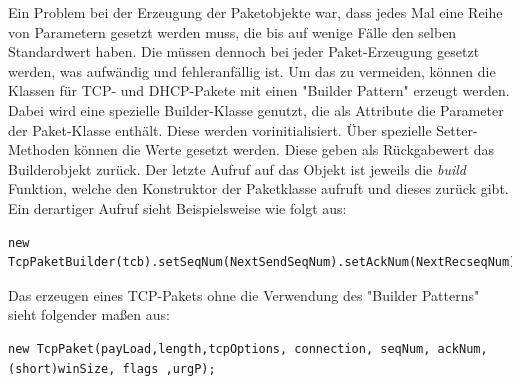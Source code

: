 Ein Problem bei der Erzeugung der Paketobjekte war, dass jedes Mal eine Reihe von Parametern gesetzt werden muss, die bis auf wenige Fälle den selben Standardwert haben. Die müssen dennoch bei jeder Paket-Erzeugung gesetzt werden, was aufwändig und fehleranfällig ist. Um das zu vermeiden, können die Klassen für TCP- und DHCP-Pakete mit einen "{}Builder Pattern"{} erzeugt werden.  Dabei wird eine spezielle Builder-Klasse genutzt, die als Attribute die Parameter der Paket-Klasse enthält. Diese werden vorinitialisiert. Über spezielle Setter-Methoden können die Werte gesetzt werden. Diese geben als Rückgabewert das Builderobjekt zurück. Der letzte Aufruf auf das Objekt ist jeweils die \textit{build} Funktion, welche den Konstruktor der Paketklasse aufruft und dieses zurück gibt. Ein derartiger Aufruf sieht Beispielsweise wie folgt aus: 
\lstset{language=Java}
\begin{lstlisting}
new TcpPaketBuilder(tcb).setSeqNum(NextSendSeqNum).setAckNum(NextRecseqNum).setAck().build()
\end{lstlisting}
Das erzeugen eines TCP-Pakets ohne die Verwendung des "{}Builder Patterns"{} sieht folgender maßen aus: 

\begin{lstlisting}
new TcpPaket(payLoad,length,tcpOptions, connection, seqNum, ackNum, (short)winSize, flags ,urgP);
\end{lstlisting}



